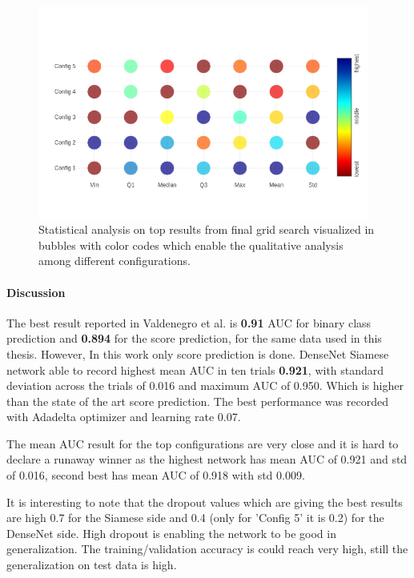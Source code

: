 \begin{figure}[ht]
\centering
\includegraphics[height= 7cm]{images/densenet/siamese/top5_final_bubble_compare}
\caption[Top five network statistical comparison in bubble plot]{Statistical analysis on top results from final grid search visualized in bubbles with color codes which enable the qualitative analysis among different configurations.}
\label{fig:top5_analysis_bubble}
\end{figure}


\paragraph{Discussion\\}
The best result reported in Valdenegro et al. \cite{stateoftheart} is \textbf{0.91} AUC for binary class prediction and \textbf{0.894} for the score prediction, for the same data used in this thesis. However, 
In this work only score prediction is done. DenseNet Siamese network able to record highest mean AUC in ten trials \textbf{0.921}, with standard deviation across the trials of 0.016 and maximum AUC of 0.950. 
Which is higher than the state of the art score prediction.
The best performance was recorded with Adadelta optimizer and learning rate 0.07. %

The mean AUC result for the top configurations are very close and it is hard to declare a runaway winner as the highest network has mean AUC of 0.921 and std of 0.016, second best has mean AUC of 0.918 with std 0.009. 

It is interesting to note that the dropout values which are giving the best results are high 0.7 for the Siamese side and 0.4 (only for 'Config 5' it is 0.2) for the DenseNet side. 
High dropout is enabling the network to be good in generalization. The training/validation accuracy is could reach very high, still the generalization on test data is high.

